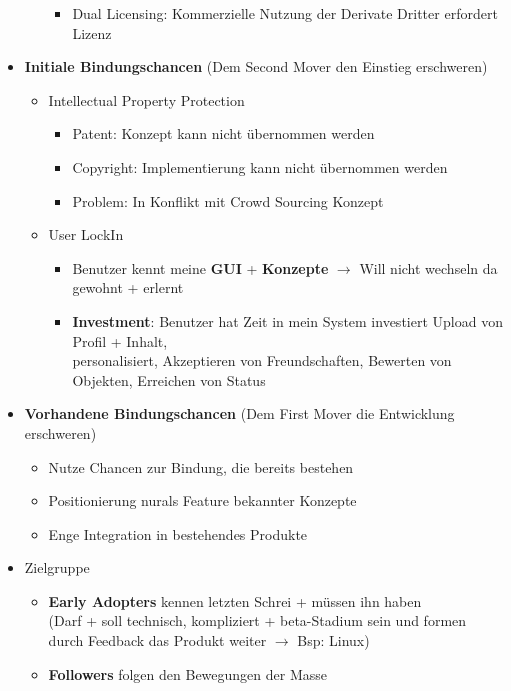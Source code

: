 \documentclass{article} %
\begin{document}
\begin{itemize}
\begin{itemize}
\begin{itemize}
					\item Dual Licensing: Kommerzielle Nutzung der Derivate Dritter erfordert Lizenz
				\end{itemize}
			\end{itemize}
			\item \textbf{Initiale Bindungschancen} (Dem Second Mover den Einstieg erschweren)
			\begin{itemize}
				\item Intellectual Property Protection
				\begin{itemize}
					\item Patent: Konzept kann nicht übernommen werden
					\item Copyright: Implementierung kann nicht übernommen werden
					\item Problem: In Konflikt mit Crowd Sourcing Konzept
				\end{itemize}
				\item User LockIn
				\begin{itemize}
					\item Benutzer kennt meine \textbf{GUI} + \textbf{Konzepte} $\rightarrow$ Will nicht wechseln da gewohnt + erlernt
					\item \textbf{Investment}: Benutzer hat Zeit in mein System investiert Upload von Profil + Inhalt, \\
					personalisiert, Akzeptieren von Freundschaften, Bewerten von Objekten, Erreichen von Status
				\end{itemize}
			\end{itemize}
			\item \textbf{Vorhandene Bindungschancen} (Dem First Mover die Entwicklung erschweren)			
			\begin{itemize}
				\item Nutze Chancen zur Bindung, die bereits bestehen
				\item Positionierung \glqq nur\grqq als Feature bekannter Konzepte
				\item Enge Integration in bestehendes Produkte
			\end{itemize}
			\item Zielgruppe
			\begin{itemize}
				\item \textbf{Early Adopters} kennen letzten Schrei + müssen ihn haben\\
				(Darf + soll technisch, kompliziert + beta-Stadium sein und formen durch Feedback das Produkt weiter $\rightarrow$ Bsp: Linux)
				\item \textbf{Followers} folgen den Bewegungen der Masse\\

\end{itemize}
\end{itemize}
\end{document}
